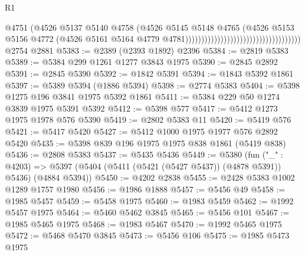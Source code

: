 \begin{lexlean}{R1}
\begin{coremodule}
                                                                    @4751
                                                                    (@4526
                                                                      @5137
                                                                      @5140
                                                                      @4758
                                                                      (@4526
                                                                        @5145
                                                                        @5148
                                                                        @4765
                                                                        (@4526
                                                                          @5153
                                                                          @5156
                                                                          @4772
                                                                          (@4526
                                                                            @5161
                                                                            @5164
                                                                            @4779
                                                                            @4781))))))))))))))))))))))))))))))))))))
    @2754
    @2881
@5383 := @2389 (@2393 @1892) @2396
@5384 := @2819 @5383
@5389 := @5384 @299 @1261 @1277 @3843 @1975
@5390 := @2845 @2892
@5391 := @2845 @5390
@5392 := @1842 @5391
@5394 := @1843 @5392 @1861
@5397 := @5389 @5394 (@1886 @5394)
@5398 := @2774 @5383
@5404 := @5398 @1275 @196 @3841 @1975 @5392 @1861
@5411 := @5384 @229 @50 @1274 @3839 @1975 @5391 @5392
@5412 := @5398 @577
@5417 := @5412 @1273 @1975 @1978 @576 @5390
@5419 := @2802 @5383 @11
@5420 := @5419 @576
@5421 := @5417 @5420
@5427 := @5412 @1000 @1975 @1977 @576 @2892 @5420
@5435 := @5398 @839 @196 @1975 @1975 @838 @1861 (@5419 @838)
@5436 := @2808 @5383
@5437 := @5435 @5436
@5449 := @5380
    (fun ("_" : @4203) =>
    @5397 (@5404 (@5411 (@5421 (@5427 @5437)) (@4878 @5391)) @5436) (@4884 @5394))
@5450 := @4202 @2838
@5455 := @2428 @5383 @1002 @1289 @1757 @1980
@5456 := @1986 @1888
@5457 := @5456 @49
@5458 := @1985 @5457
@5459 := @5458 @1975
@5460 := @1983 @5459
@5462 := @1992 @5457 @1975
@5464 := @5460 @5462 @3845
@5465 := @5456 @101
@5467 := @1985 @5465 @1975
@5468 := @1983 @5467
@5470 := @1992 @5465 @1975
@5472 := @5468 @5470 @3845
@5473 := @5456 @106
@5475 := @1985 @5473 @1975

\end{coremodule}
\end{lexlean}
